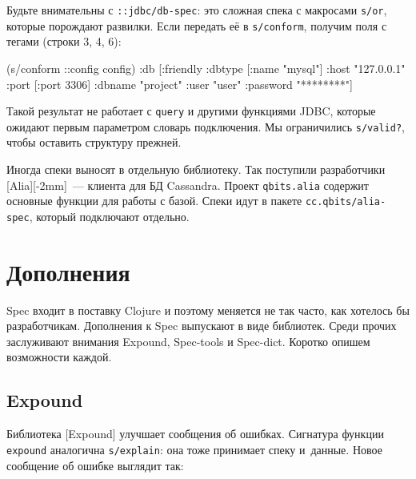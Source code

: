\fi

\label{jdbc-conform-warning}


Будьте внимательны с \verb|::jdbc/db-spec|: это сложная спека с макросами
\verb|s/or|, которые порождают развилки. Если передать её в
\verb|s/conform|, получим поля с тегами (строки 3, 4, 6):

\begin{english}
  \begin{clojure/lines}
(s/conform ::config config)
{:db
 [:friendly
  {:dbtype   [:name "mysql"]
   :host     "127.0.0.1"
   :port     [:port 3306]
   :dbname   "project"
   :user     "user"
   :password "********"}]}
  \end{clojure/lines}
\end{english}

Такой результат не работает с \verb|query| и другими функциями JDBC, которые
ожидают первым параметром словарь подключения. Мы ограничились \verb|s/valid?|,
чтобы оставить структуру прежней.

Иногда спеки выносят в отдельную библиотеку. Так поступили разработчики
[Alia][-2mm]~--- клиента для БД
Cassandra. Проект \verb|qbits.alia| содержит основные функции для работы с
базой. Спеки идут в пакете \verb|cc.qbits/alia-spec|, который подключают
отдельно.

\section{Дополнения}

Spec входит в поставку Clojure и поэтому меняется не так часто, как хотелось бы
разработчикам. Дополнения к Spec выпускают в виде библиотек. Среди прочих
заслуживают внимания Expound, Spec-tools и Spec-dict. Коротко опишем возможности каждой.

\subsection{Expound}


Библиотека [Expound] улучшает сообщения об
ошибках. Сигнатура функции \verb|expound| аналогична \verb|s/explain|: она
тоже принимает спеку и~данные. Новое сообщение об ошибке выглядит так:


